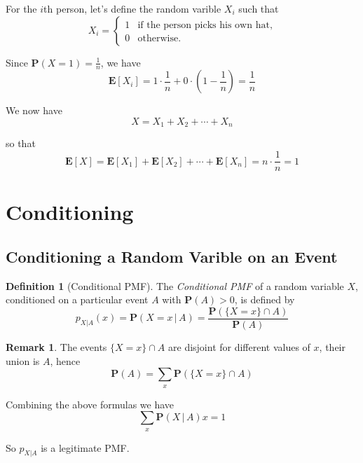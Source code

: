 \documentclass{tufte-handout}
\theoremstyle{definition} \newtheorem{definition}{Definition}
\theoremstyle{definition} \newtheorem{remark}{Remark}
\newcommand{\prob}[1]{\mathbf{P} \left( #1 \right)}
\newcommand{\cprob}[2]{\mathbf{P} \left( #1 \, | \, #2 \right)}
\newcommand{\expt}[1]{\mathbf{E} \left[ #1 \right]}
\newcommand{\cpmf}[3]{p_{#1 | #2} \left( #3 \right)}
\begin{document}
\begin{solution}
  For the $i$th person, let's define the random varible $X_i$ such that
  \begin{equation*}
    X_i =
    \begin{cases}
      1 & \text{if the person picks his own hat},\\
      0 & \text{otherwise}.
    \end{cases}
  \end{equation*}

  Since $\prob{X = 1} = \frac{1}{n}$, we have
  \begin{equation*}
    \expt{X_i} = 1 \cdot \frac{1}{n} + 0 \cdot (1 - \frac{1}{n})
    = \frac{1}{n}
  \end{equation*}

  We now have
  \begin{equation*}
    X = X_1 + X_2 + \cdots + X_n
  \end{equation*}

  so that
  \begin{equation*}
    \expt{X} = \expt{X_1} + \expt{X_2} + \cdots + \expt{X_n}
    = n \cdot \frac{1}{n} = 1
  \end{equation*}
\end{solution}

\section{Conditioning}

\subsection{Conditioning a Random Varible on an Event}

\begin{definition}[Conditional PMF]
  The \emph{Conditional PMF} of a random variable $X$, conditioned on a
  particular event $A$ with $\prob{A} > 0$, is defined by
  \begin{equation*}
    \cpmf{X}{A}{x} = \cprob{X = x}{A}
    = \frac{ \prob{\{X = x \} \cap A}}{\prob{A}}
  \end{equation*}
\end{definition}

\begin{remark}
  The events $\{X = x\} \cap A$ are disjoint for different values of $x$,
  their union is $A$, hence
  \begin{equation*}
    \prob{A} = \sum_x \prob{\{X = x\} \cap A}
  \end{equation*}

  Combining the above formulas we have
  \begin{equation*}
    \sum_x \cprob{X}{A}{x} = 1
  \end{equation*}

  So $p_{X|A}$ is a legitimate PMF.
\end{remark}
\end{document}
